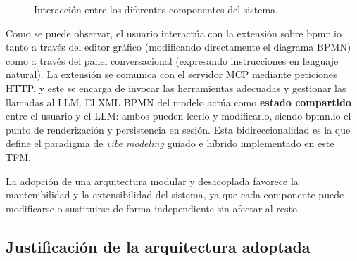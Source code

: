 \begin{figure}[ht]
{%
}
\caption{Interacción entre los diferentes componentes del sistema.}
\label{fig:arquitecturaSistema}
\end{figure}
\shorthandon{<>}



Como se puede observar, el usuario interactúa con la extensión sobre bpmn.io tanto a través del editor gráfico (modificando directamente el diagrama BPMN) como a través del panel conversacional (expresando instrucciones en lenguaje natural). La extensión se comunica con el servidor MCP mediante peticiones HTTP, y este se encarga de invocar las herramientas adecuadas y gestionar las llamadas al LLM. El XML BPMN del modelo actúa como \textbf{estado compartido} entre el usuario y el LLM: ambos pueden leerlo y modificarlo, siendo bpmn.io el punto de renderización y persistencia en sesión. Esta bidireccionalidad es la que define el paradigma de \textit{vibe modeling} guiado e híbrido implementado en este TFM.

La adopción de una arquitectura modular y desacoplada favorece la mantenibilidad y la extensibilidad del sistema, ya que cada componente puede modificarse o sustituirse de forma independiente sin afectar al resto.

\subsection{Justificación de la arquitectura adoptada}


